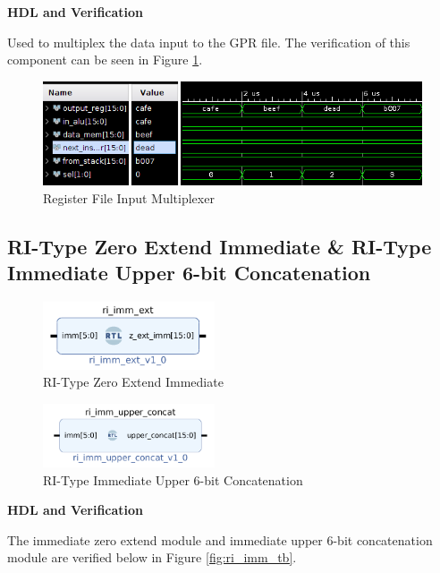 \documentclass{article}
\newcommand{\stitle}{HDL and Verification}
\begin{document}
\begin{par}
	\textbf{\stitle}
	\begin{par}
		Used to multiplex the data input to the GPR file. The verification of this component can be seen in Figure \ref{fig:gprMuxTB}.
	\end{par}
	
	\begin{figure}[H]
		\centering
		\includegraphics[width=5in]{img/regFileMuxTB.png}
		\caption{Register File Input Multiplexer}
		\label{fig:gprMuxTB}
	\end{figure}
	
	\newpage

	\subsection{RI-Type Zero Extend Immediate \& RI-Type Immediate Upper 6-bit Concatenation}
	
	\begin{figure}[H]
		\centering
		\includegraphics[width=2in]{img/riImmExt.png}
		\caption{RI-Type Zero Extend Immediate}
	\end{figure}

	\begin{figure}[H]
		\centering
		\includegraphics[width=2in]{img/upcon.png}
		\caption{RI-Type Immediate Upper 6-bit Concatenation}
	\end{figure}
	
	\textbf{\stitle}
	\begin{par}
		The immediate zero extend module and immediate upper 6-bit concatenation module are verified below in Figure \ref{fig:ri_imm_tb}. 
	\end{par}


\end{par}
\end{document}
